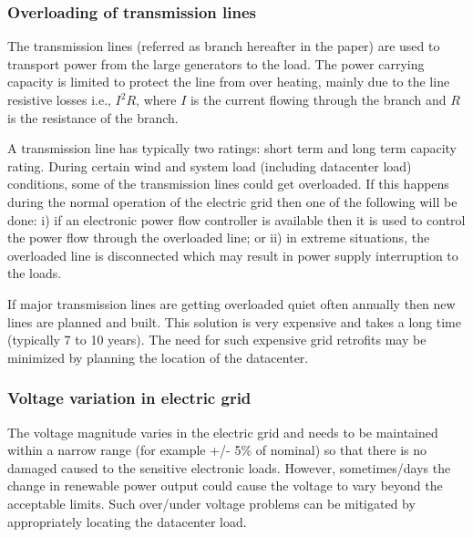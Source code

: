 \subsubsection{Overloading of transmission lines}
The transmission lines (referred as branch hereafter in the paper) are used to transport power from the large generators to the load. The power carrying capacity is limited to protect the line from over heating, mainly due to the line resistive losses i.e., $I^{2}R$, where $I$ is the current flowing through the branch and $R$ is the resistance of the branch.

A transmission line has typically two ratings: short term and long term capacity rating. During certain wind and system load (including datacenter load) conditions, some of the transmission lines could get overloaded. If this happens during the normal operation of the electric grid then one of the following will be done: i) if an electronic power flow controller is available then it is used to control the power flow through the overloaded line; or ii) in extreme situations, the overloaded line is disconnected which may result in power supply interruption to the loads.

If major transmission lines are getting overloaded quiet often annually then new lines are planned and built. This solution is very expensive and takes a long time (typically 7 to 10 years). The need for such expensive grid retrofits may be minimized by planning the location of the datacenter.

\subsubsection{Voltage variation in electric grid}
The voltage magnitude varies in the electric grid and needs to be maintained within a narrow range (for example +/- 5\% of nominal) so that there is no damaged caused to the sensitive electronic loads. However, sometimes/days the change in renewable power output could cause the voltage to vary beyond the acceptable limits. Such over/under voltage problems can be mitigated by appropriately locating the datacenter load.

